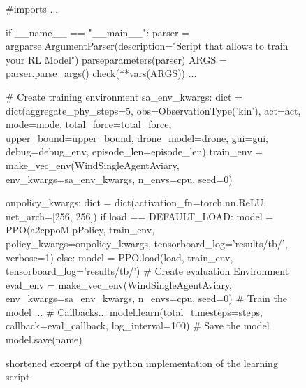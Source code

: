 \begin{figure}[htp]
\begin{python}
	#imports
	...
	
	if __name__ == "__main__":
		parser = argparse.ArgumentParser(description="Script that allows to train your RL Model")
		parseparameters(parser)
		ARGS = parser.parse_args()
		check(**vars(ARGS))
		...
		
		# Create training environment 
		sa_env_kwargs: dict = dict(aggregate_phy_steps=5, obs=ObservationType('kin'), act=act, mode=mode,
		total_force=total_force, upper_bound=upper_bound, drone_model=drone, gui=gui,
		debug=debug_env, episode_len=episode_len)
		train_env = make_vec_env(WindSingleAgentAviary, env_kwargs=sa_env_kwargs, n_envs=cpu, seed=0)
	
		onpolicy_kwargs: dict = dict(activation_fn=torch.nn.ReLU, net_arch=[256, 256])
		if load == DEFAULT_LOAD:
			model = PPO(a2cppoMlpPolicy,
				train_env,
				policy_kwargs=onpolicy_kwargs,
				tensorboard_log='results/tb/',
				verbose=1)
		else:
			model = PPO.load(load, train_env, tensorboard_log='results/tb/')
		# Create evaluation Environment 
		eval_env = make_vec_env(WindSingleAgentAviary, env_kwargs=sa_env_kwargs, n_envs=cpu, seed=0)
		# Train the model 
		... # Callbacks...
		model.learn(total_timesteps=steps, callback=eval_callback, 
		log_interval=100)
		# Save the model 
		model.save(name)
\end{python}
\caption{shortened excerpt of the python implementation of the learning script}
\end{figure}